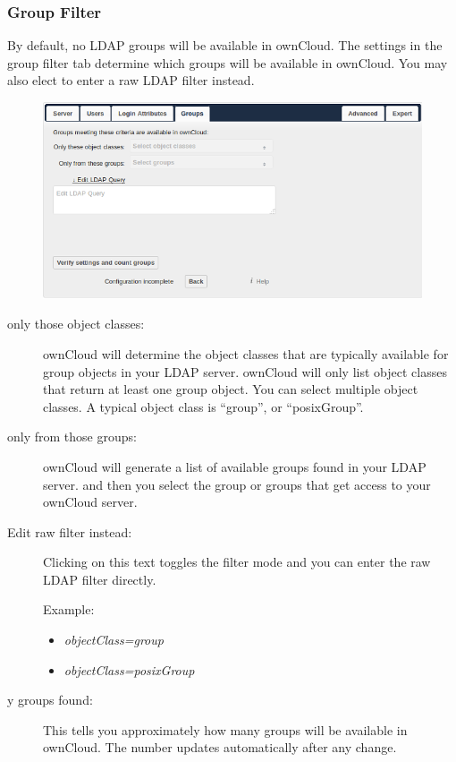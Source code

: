 \documentclass[letterpaper,10pt,english]{sphinxmanual}
\begin{document}
\subsubsection{Group Filter}
\label{configuration_user/user_auth_ldap:group-filter}
By default, no LDAP groups will be available in ownCloud. The settings in the
group filter tab determine which groups will be available in ownCloud. You may
also elect to enter a raw LDAP filter instead.
\begin{figure}[htbp]
\centering

\includegraphics{ldap-wizard-4-group.png}
\end{figure}
\begin{description}
\item[{only those object classes:}] \leavevmode
ownCloud will determine the object classes that are typically available for
group objects in your LDAP server. ownCloud will only list object
classes that return at least one group object. You can select multiple
object classes. A typical object class is ``group'', or ``posixGroup''.

\item[{only from those groups:}] \leavevmode
ownCloud will generate a list of available groups found in your LDAP server.
and then you select the group or groups that get access to your ownCloud
server.

\item[{Edit raw filter instead:}] \leavevmode
Clicking on this text toggles the filter mode and you can enter the raw LDAP
filter directly.

Example:
\begin{itemize}
\item {} 
\emph{objectClass=group}

\item {} 
\emph{objectClass=posixGroup}

\end{itemize}

\item[{y groups found:}] \leavevmode
This tells you approximately how many groups will be available in ownCloud.
The number updates automatically after any change.

\end{description}
\end{document}
